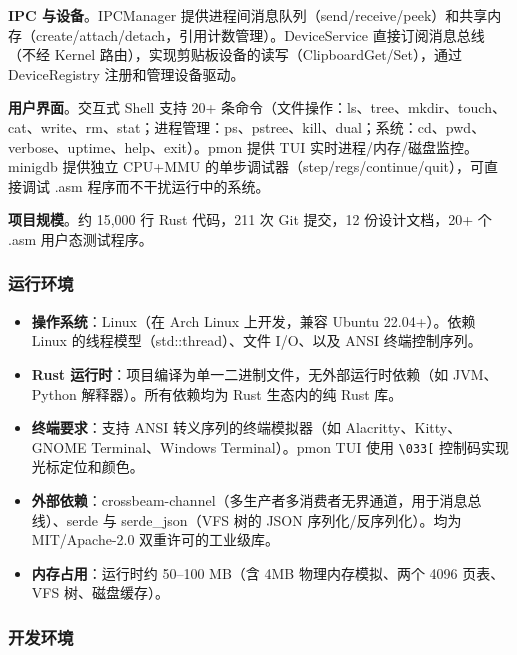 \documentclass[UTF8,a4paper,12pt]{ctexart}
\begin{document}
\textbf{IPC 与设备}。IPCManager 提供进程间消息队列（send/receive/peek）和共享内存（create/attach/detach，引用计数管理）。DeviceService 直接订阅消息总线（不经 Kernel 路由），实现剪贴板设备的读写（ClipboardGet/Set），通过 DeviceRegistry 注册和管理设备驱动。

\textbf{用户界面}。交互式 Shell 支持 20+ 条命令（文件操作：ls、tree、mkdir、touch、cat、write、rm、stat；进程管理：ps、pstree、kill、dual；系统：cd、pwd、verbose、uptime、help、exit）。pmon 提供 TUI 实时进程/内存/磁盘监控。minigdb 提供独立 CPU+MMU 的单步调试器（step/regs/continue/quit），可直接调试 .asm 程序而不干扰运行中的系统。

\textbf{项目规模}。约 15,000 行 Rust 代码，211 次 Git 提交，12 份设计文档，20+ 个 .asm 用户态测试程序。

\subsubsection{运行环境}

\begin{itemize}
    \item \textbf{操作系统}：Linux（在 Arch Linux 上开发，兼容 Ubuntu 22.04+）。依赖 Linux 的线程模型（std::thread）、文件 I/O、以及 ANSI 终端控制序列。
    \item \textbf{Rust 运行时}：项目编译为单一二进制文件，无外部运行时依赖（如 JVM、Python 解释器）。所有依赖均为 Rust 生态内的纯 Rust 库。
    \item \textbf{终端要求}：支持 ANSI 转义序列的终端模拟器（如 Alacritty、Kitty、GNOME Terminal、Windows Terminal）。pmon TUI 使用 \texttt{\textbackslash{}033[} 控制码实现光标定位和颜色。
    \item \textbf{外部依赖}：crossbeam-channel（多生产者多消费者无界通道，用于消息总线）、serde 与 serde\_json（VFS 树的 JSON 序列化/反序列化）。均为 MIT/Apache-2.0 双重许可的工业级库。
    \item \textbf{内存占用}：运行时约 50--100 MB（含 4MB 物理内存模拟、两个 4096 页表、VFS 树、磁盘缓存）。
\end{itemize}

\subsubsection{开发环境}
\end{document}
